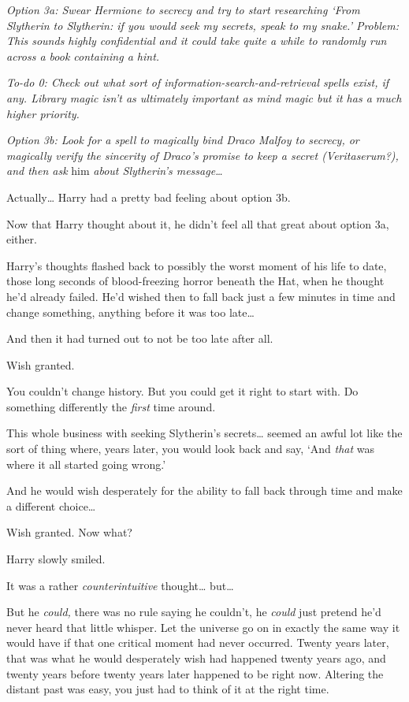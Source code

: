 \emph{Option 3a: Swear Hermione to secrecy and try to start researching `From
Slytherin to Slytherin: if you would seek my secrets, speak to my snake.'
Problem: This sounds highly confidential and it could take quite a while to
randomly run across a book containing a hint.}

\emph{To-do 0: Check out what sort of information-search-and-retrieval spells
exist, if any. Library magic isn't as ultimately important as mind magic but it
has a much higher priority.}

\emph{Option 3b: Look for a spell to magically bind Draco Malfoy to secrecy, or
magically verify the sincerity of Draco's promise to keep a secret
(Veritaserum?), and then ask} him \emph{about Slytherin's message{\ldots}}

Actually{\ldots} Harry had a pretty bad feeling about option 3b.

Now that Harry thought about it, he didn't feel all that great about option 3a,
either.

Harry's thoughts flashed back to possibly the worst moment of his life to date,
those long seconds of blood-freezing horror beneath the Hat, when he thought
he'd already failed. He'd wished then to fall back just a few minutes in time
and change something, anything before it was too late{\ldots}

And then it had turned out to not be too late after all.

Wish granted.

You couldn't change history. But you could get it right to start with. Do
something differently the \emph{first} time around.

This whole business with seeking Slytherin's secrets{\ldots} seemed an awful
lot like the sort of thing where, years later, you would look back and say,
`And \emph{that} was where it all started going wrong.'

And he would wish desperately for the ability to fall back through time and
make a different choice{\ldots}

Wish granted. Now what?

Harry slowly smiled.

It was a rather \emph{counterintuitive} thought{\ldots} but{\ldots}

But he \emph{could,} there was no rule saying he couldn't, he \emph{could} just
pretend he'd never heard that little whisper. Let the universe go on in exactly
the same way it would have if that one critical moment had never occurred.
Twenty years later, that was what he would desperately wish had happened twenty
years ago, and twenty years before twenty years later happened to be right now.
Altering the distant past was easy, you just had to think of it at the right
time.

